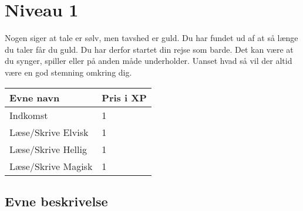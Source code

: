 \chapter*{Niveau 1}
Nogen siger at tale er sølv, men tavshed er guld. Du har fundet ud af at så længe du taler får du guld. Du har derfor startet din rejse som barde. Det kan være at du synger, spiller eller på anden måde underholder. Uanset hvad så vil der altid være en god stemning omkring dig.
\begin{table}[H]
    \centering
    \begin{tabular}{|p{}|p{}|}
    \rowcolor{cerulean!80}\hline
        Evne navn & Pris i XP \\\hline
         Indkomst & 1 \\\hline
         Læse/Skrive Elvisk & 1 \\\hline
         Læse/Skrive Hellig & 1 \\\hline
         Læse/Skrive Magisk & 1 \\\hline
    \end{tabular}
\end{table}

\section*{Evne beskrivelse}








